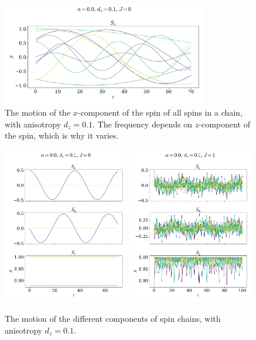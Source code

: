 \documentclass{article}
\begin{document}
    \begin{figure}[H]
        \centering
        \includegraphics[width=0.8\textwidth]{../plots/2221a.pdf}
        \caption{The motion of the $x$-component of the spin of all spins in a chain, with anisotropy $d_z=0.1$. The frequency depends on $z$-component of the spin, which is why it varies.}
        \label{all tilted}
    \end{figure}


    \begin{figure}[H]
        \centering
        \includegraphics[width=0.49\textwidth]{../plots/2221b.pdf}
        \includegraphics[width=0.49\textwidth]{../plots/2222.pdf}
        \caption{The motion of the different components of spin chains, with anisotropy $d_z=0.1$.}
        \label{one tilted}
    \end{figure}
\end{document}
